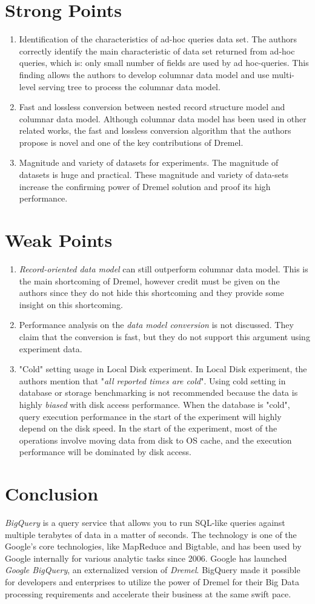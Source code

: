 \documentclass[twocolumn]{article}
\newcommand{\be}{\begin{enumerate}}
\newcommand{\ee}{\end{enumerate}}
\newcommand{\ii}{\item}
\begin{document}
\section{Strong Points}
\be
\ii Identification of the characteristics of ad-hoc queries data set.
The authors correctly identify the main characteristic of data set returned from ad-hoc queries, which is: only small number of fields are used by ad hoc-queries. This finding allows the authors to develop columnar data model and use multi-level serving tree to process the columnar data model.
\ii Fast and lossless conversion between nested record structure model and columnar data model.
Although columnar data model has been used in other related works, the fast and lossless conversion algorithm that the authors propose is novel and one of the key contributions of Dremel.
\ii Magnitude and variety of datasets for experiments.
The magnitude of datasets is huge and practical. These magnitude and variety of data-sets increase the confirming power of Dremel solution and proof its high performance.
\ee
\section{Weak Points}
\be
\ii \textit{Record-oriented data model} can still outperform columnar data model. This is the main shortcoming of Dremel, however credit must be given on the authors since they do not hide this shortcoming and they provide some insight on this shortcoming.
\ii Performance analysis on the \textit{data model conversion} is not discussed. They claim that the conversion is fast, but they do not support this argument using experiment data.
\ii "Cold" setting usage in Local Disk experiment. In Local Disk experiment, the authors mention that "\textit{all reported times are cold}". Using cold setting in database or storage benchmarking is not recommended because the data is highly \textit{biased} with disk access performance. When the database is "cold", query execution performance in the start of the experiment will highly depend on the disk speed. In the start of the experiment, most of the operations involve moving data from disk to OS cache, and the execution performance will be dominated by disk access.
\ee

\section{Conclusion}
\textit{BigQuery} is a query service that allows you to run SQL-like queries against multiple terabytes of data in a matter of seconds. 
The technology is one of the Google’s core technologies, like MapReduce and Bigtable, and has been used by Google internally for various analytic tasks since 2006. Google has launched \textit{Google BigQuery}, an externalized version of \textit{Dremel}. BigQuery made it possible for developers and enterprises to utilize the power of Dremel for their Big Data processing requirements and accelerate their business at the same swift pace.
\end{document}
